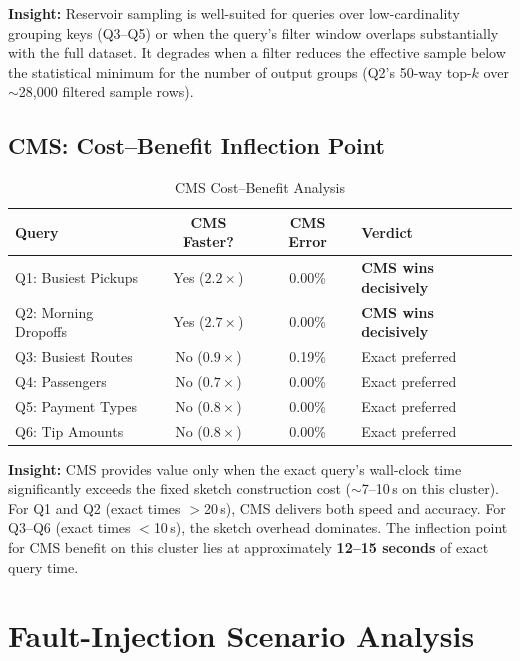 \documentclass{article}
\begin{document}
\textbf{Insight:} Reservoir sampling is well-suited for queries over low-cardinality grouping keys (Q3--Q5) or when the query's filter window overlaps substantially with the full dataset. It degrades when a filter reduces the effective sample below the statistical minimum for the number of output groups (Q2's 50-way top-$k$ over $\sim$28{,}000 filtered sample rows).

\subsection{CMS: Cost--Benefit Inflection Point}

\begin{table}[H]
\centering
\caption{CMS Cost--Benefit Analysis}
\label{tab:cms_costbenefit}
\begin{tabular}{l c c l}
\toprule
\textbf{Query} & \textbf{CMS Faster?} & \textbf{CMS Error} & \textbf{Verdict} \\
\midrule
Q1: Busiest Pickups     & Yes ($2.2\times$)  & 0.00\% & \textbf{CMS wins decisively} \\
Q2: Morning Dropoffs    & Yes ($2.7\times$)  & 0.00\% & \textbf{CMS wins decisively} \\
Q3: Busiest Routes      & No ($0.9\times$)   & 0.19\% & Exact preferred \\
Q4: Passengers          & No ($0.7\times$)   & 0.00\% & Exact preferred \\
Q5: Payment Types       & No ($0.8\times$)   & 0.00\% & Exact preferred \\
Q6: Tip Amounts         & No ($0.8\times$)   & 0.00\% & Exact preferred \\
\bottomrule
\end{tabular}
\end{table}

\textbf{Insight:} CMS provides value only when the exact query's wall-clock time significantly exceeds the fixed sketch construction cost ($\sim$7--10\,s on this cluster). For Q1 and Q2 (exact times $>$20\,s), CMS delivers both speed and accuracy. For Q3--Q6 (exact times $<$10\,s), the sketch overhead dominates. The inflection point for CMS benefit on this cluster lies at approximately \textbf{12--15 seconds} of exact query time.



\section{Fault-Injection Scenario Analysis}
\label{sec:fault}
\end{document}
